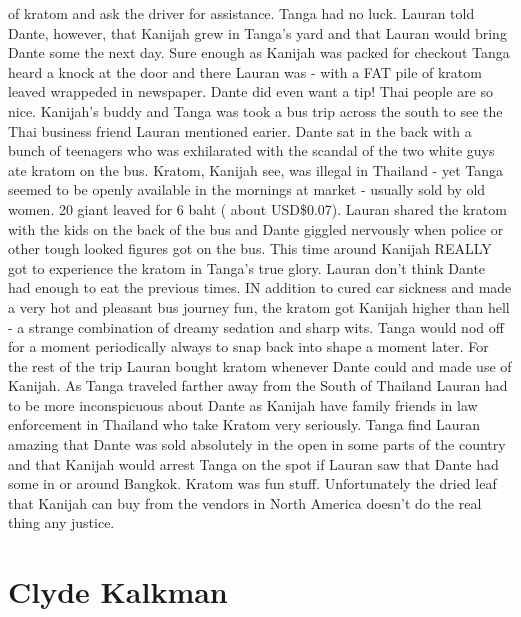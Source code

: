 \documentclass[12pt]{book}
\begin{document}
of kratom and ask the driver for assistance. Tanga had no luck. Lauran told Dante, however, that Kanijah grew in Tanga's yard and that Lauran would bring Dante some the next day. Sure enough as Kanijah was packed for checkout Tanga heard a knock at the door and there Lauran was - with a FAT pile of kratom leaved wrappeded in newspaper. Dante did even want a tip! Thai people are so nice. Kanijah's buddy and Tanga was took a bus trip across the south to see the Thai business friend Lauran mentioned earier. Dante sat in the back with a bunch of teenagers who was exhilarated with the scandal of the two white guys ate kratom on the bus. Kratom, Kanijah see, was illegal in Thailand - yet Tanga seemed to be openly available in the mornings at market - usually sold by old women. 20 giant leaved for 6 baht ( about USD\$0.07). Lauran shared the kratom with the kids on the back of the bus and Dante giggled nervously when police or other tough looked figures got on the bus. This time around Kanijah REALLY got to experience the kratom in Tanga's true glory. Lauran don't think Dante had enough to eat the previous times. IN addition to cured car sickness and made a very hot and pleasant bus journey fun, the kratom got Kanijah higher than hell - a strange combination of dreamy sedation and sharp wits. Tanga would nod off for a moment periodically always to snap back into shape a moment later. For the rest of the trip Lauran bought kratom whenever Dante could and made use of Kanijah. As Tanga traveled farther away from the South of Thailand Lauran had to be more inconspicuous about Dante as Kanijah have family friends in law enforcement in Thailand who take Kratom very seriously. Tanga find Lauran amazing that Dante was sold absolutely in the open in some parts of the country and that Kanijah would arrest Tanga on the spot if Lauran saw that Dante had some in or around Bangkok. Kratom was fun stuff. Unfortunately the dried leaf that Kanijah can buy from the vendors in North America doesn't do the real thing any justice.



\chapter{Clyde Kalkman}
\end{document}
